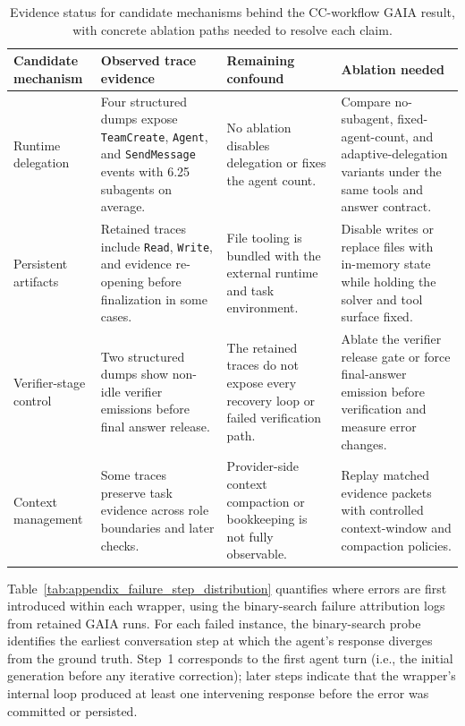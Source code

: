 \begin{table}[t]
\centering
\caption{Evidence status for candidate mechanisms behind the CC-workflow GAIA result, with concrete ablation paths needed to resolve each claim.}
\label{tab:gaia_mechanism_evidence}
\footnotesize
\setlength{\tabcolsep}{2.5pt}
\begin{tabular}{p{}p{}p{}p{}}
\toprule
\textbf{Candidate mechanism} & \textbf{Observed trace evidence} & \textbf{Remaining confound} & \textbf{Ablation needed} \\
\midrule
Runtime delegation & Four structured dumps expose \texttt{TeamCreate}, \texttt{Agent}, and \texttt{SendMessage} events with 6.25 subagents on average. & No ablation disables delegation or fixes the agent count. & Compare no-subagent, fixed-agent-count, and adaptive-delegation variants under the same tools and answer contract. \\
Persistent artifacts & Retained traces include \texttt{Read}, \texttt{Write}, and evidence re-opening before finalization in some cases. & File tooling is bundled with the external runtime and task environment. & Disable writes or replace files with in-memory state while holding the solver and tool surface fixed. \\
Verifier-stage control & Two structured dumps show non-idle verifier emissions before final answer release. & The retained traces do not expose every recovery loop or failed verification path. & Ablate the verifier release gate or force final-answer emission before verification and measure error changes. \\
Context management & Some traces preserve task evidence across role boundaries and later checks. & Provider-side context compaction or bookkeeping is not fully observable. & Replay matched evidence packets with controlled context-window and compaction policies. \\
\bottomrule
\end{tabular}
\end{table}

Table~\ref{tab:appendix_failure_step_distribution} quantifies where errors are first introduced within each wrapper, using the binary-search failure attribution logs from retained GAIA runs. For each failed instance, the binary-search probe identifies the earliest conversation step at which the agent's response diverges from the ground truth. Step~1 corresponds to the first agent turn (i.e., the initial generation before any iterative correction); later steps indicate that the wrapper's internal loop produced at least one intervening response before the error was committed or persisted.

